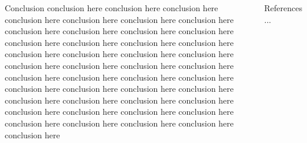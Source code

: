 \documentclass{gshs_poster_beamer}
\begin{document}
\begin{columns}[T]
\vspace{1em}

\begin{posterbox}{Conclusion}
conclusion here conclusion here conclusion here conclusion here conclusion here conclusion here conclusion here conclusion here conclusion here conclusion here conclusion here conclusion here conclusion here conclusion here conclusion here conclusion here conclusion here conclusion here conclusion here conclusion here conclusion here conclusion here conclusion here conclusion here conclusion here conclusion here conclusion here conclusion here conclusion here conclusion here conclusion here conclusion here conclusion here conclusion here conclusion here conclusion here conclusion here conclusion here conclusion here conclusion here conclusion here conclusion here conclusion here conclusion here 
\end{posterbox}

\vspace{1em}

\begin{posterbox}{References}
...
\end{posterbox}



\end{columns}
\end{document}
